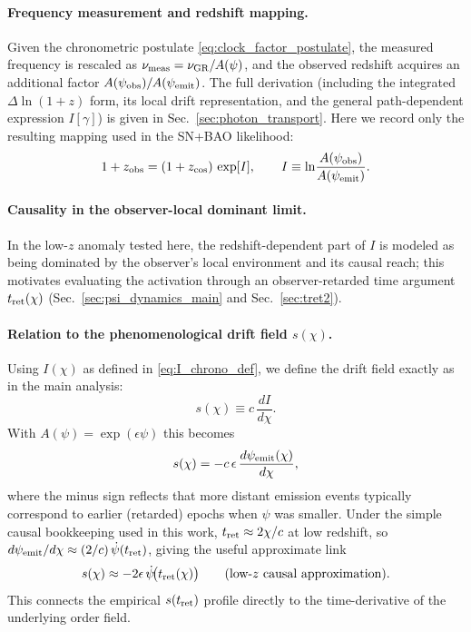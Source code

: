 \documentclass[10pt]{article}
\begin{document}
\paragraph{Frequency measurement and redshift mapping.}
Given the chronometric postulate \eqref{eq:clock_factor_postulate}, the measured frequency is rescaled as
\(\nu_{\rm meas}=\nu_{\rm GR}/A(\psi)\), and the observed redshift acquires an additional factor
\(A(\psi_{\rm obs})/A(\psi_{\rm emit})\). The full derivation (including the integrated \(\Delta\ln(1+z)\) form,
its local drift representation, and the general path-dependent expression \(I[\gamma]\)) is given in
Sec.~\ref{sec:photon_transport}. Here we record only the resulting mapping used in the SN+BAO likelihood:
\begin{equation}
1+z_{\rm obs} = (1+z_{\rm cos})\,\exp[I],
\qquad
I\equiv \ln\!\frac{A(\psi_{\rm obs})}{A(\psi_{\rm emit})}.
\label{eq:I_chrono_def}
\end{equation}

\paragraph{Causality in the observer-local dominant limit.}
In the low-$z$ anomaly tested here, the redshift-dependent part of \(I\) is modeled as being dominated by the
observer’s local environment and its causal reach; this motivates evaluating the activation through an
observer-retarded time argument \(t_{\rm ret}(\chi)\) (Sec.~\ref{sec:psi_dynamics_main} and Sec.~\ref{sec:tret2}).


\paragraph{Relation to the phenomenological drift field $s(\chi)$.}
Using $I(\chi)$ as defined in \eqref{eq:I_chrono_def}, we define the drift field exactly as in the
main analysis:
\begin{equation}
s(\chi) \equiv c\,\frac{dI}{d\chi}.
\label{eq:s_def_chrono}
\end{equation}
With $A(\psi)=\exp(\epsilon\psi)$ this becomes
\begin{equation}
s(\chi)= -c\,\epsilon\,\frac{d\psi_{\rm emit}(\chi)}{d\chi},
\label{eq:s_chrono_psi}
\end{equation}
where the minus sign reflects that more distant emission events typically correspond to earlier
(retarded) epochs when $\psi$ was smaller.
Under the simple causal bookkeeping used in this work, $t_{\rm ret}\approx 2\chi/c$ at low redshift,
so $d\psi_{\rm emit}/d\chi \approx (2/c)\,\dot\psi(t_{\rm ret})$, giving the useful approximate link
\begin{equation}
s(\chi)\approx -2\epsilon\,\dot\psi\!\bigl(t_{\rm ret}(\chi)\bigr)
\qquad (\text{low-$z$ causal approximation}).
\label{eq:s_approx_psi_dot}
\end{equation}
This connects the empirical $s(t_{\rm ret})$ profile directly to the time-derivative of the
underlying order field.
\end{document}
